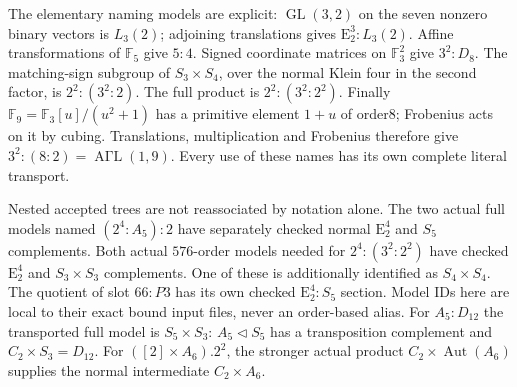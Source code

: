 \documentclass[10pt,a4paper]{article}
\newcommand{\E}{\mathrm E}\newcommand{\Aut}{\operatorname{Aut}}
\begin{document}
The elementary naming models are explicit: $\operatorname{GL}(3,2)$ on the
seven nonzero binary vectors is $L_3(2)$; adjoining translations gives
$\E_2^3:L_3(2)$. Affine transformations of $\mathbb F_5$ give $5:4$.
Signed coordinate matrices on $\mathbb F_3^2$ give $3^2:D_8$.
The matching-sign subgroup of $S_3\times S_4$, over the normal Klein four
in the second factor, is $2^2:(3^2:2)$. The full product is
$2^2:(3^2:2^2)$. Finally $\mathbb F_9=\mathbb F_3[u]/(u^2+1)$ has a
primitive element $1+u$ of order8; Frobenius acts on it by cubing.
Translations, multiplication and Frobenius therefore give
$3^2:(8:2)=\operatorname{A\Gamma L}(1,9)$.
Every use of these names has its own complete literal transport.

Nested accepted trees are not reassociated by notation alone. The two
actual full models named $(2^4:A_5):2$ have separately checked normal
$\E_2^4$ and $S_5$ complements. Both actual $576$-order models needed for
$2^4:(3^2:2^2)$ have checked $\E_2^4$ and $S_3\times S_3$ complements.
One of these is additionally identified as $S_4\times S_4$. The quotient
of slot $66:P3$ has its own checked $\E_2^4:S_5$ section. Model IDs here
are local to their exact bound input files, never an order-based alias.
For $A_5:D_{12}$ the transported full model is $S_5\times S_3$:
$A_5\lhd S_5$ has a transposition complement and $C_2\times S_3=D_{12}$.
For $([2]\times A_6).2^2$, the stronger actual product
$C_2\times\Aut(A_6)$ supplies the normal intermediate $C_2\times A_6$.
\end{document}
